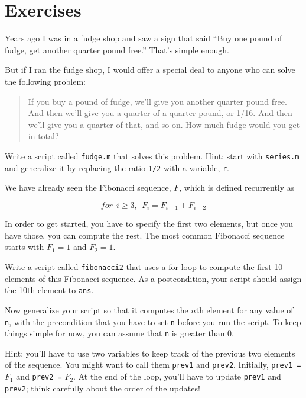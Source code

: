 \section{Exercises}

\begin{ex}
Years ago I was in a fudge shop and saw a sign that said ``Buy one pound of fudge, get another quarter pound free.''  That's simple enough.

But if I ran the fudge shop, I would offer a special deal to anyone who can solve the following problem:

\begin{quote}
If you buy a pound of fudge, we'll give you another quarter pound free.  And then we'll give you a quarter of a quarter pound, or 1/16.  And then we'll give you a quarter of that, and so on.  How much fudge would you get in total?
\end{quote}

Write a script called {\tt fudge.m} that solves this problem.  Hint: start with {\tt series.m} and generalize it by replacing the ratio {\tt 1/2} with a variable, {\tt r}.

\end{ex}



\begin{ex}
\label{fib2}

We have already seen the Fibonacci sequence, $F$, which
is defined recurrently as

\[ for~~i \ge 3, ~~  F_{i} = F_{i-1} + F_{i-2} \]

In order to get started, you have to specify the first two
elements, but once you have those, you can compute the rest.
The most common Fibonacci sequence starts with $F_1 = 1$ and $F_2 = 1$.

Write a script called {\tt fibonacci2} that uses a for loop
to compute the first 10 elements of this Fibonacci sequence.
As a postcondition, your script should assign the 10th element to
{\tt ans}.

Now generalize your script so that it computes the $n$th element
for any value of {\tt n}, with the precondition that you have to
set {\tt n} before you run the script.  To keep things simple for
now, you can assume that {\tt n} is greater than 0.

Hint: you'll have to use two variables to keep track of the
previous two elements of the sequence.  You might want to call
them {\tt prev1} and {\tt prev2}.  Initially, {\tt prev1 =} $F_1$
and {\tt prev2 =} $F_2$.  At the end of the loop, you'll have
to update {\tt prev1} and {\tt prev2}; think carefully about the
order of the updates!
\end{ex}

